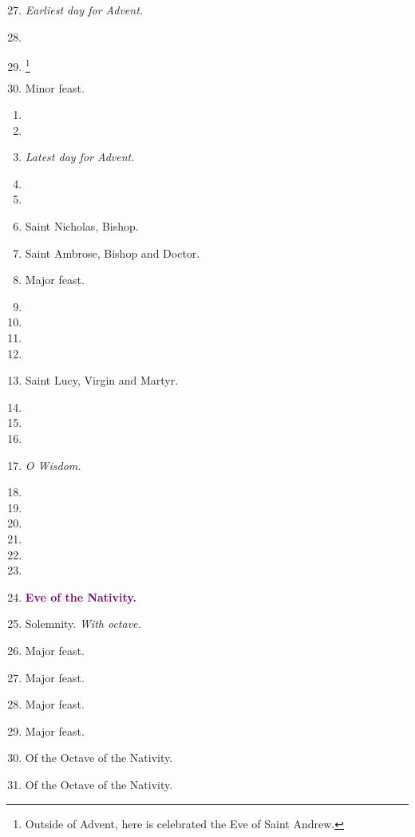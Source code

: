 		\begin{enumerate}
			\setcounter{enumi}{26}
			\item {\textit{\small Earliest day for Advent.}}
			\item %
			\item \footnote{Outside of Advent, here is celebrated the Eve of Saint Andrew.}
			\item {} Minor feast.
		\end{enumerate}
		\begin{enumerate}
			\item %
			\item %
			\item \textit{\small Latest day for Advent.} %
			\item  %
			\item %
			\item Saint Nicholas, Bishop. 
			\item Saint Ambrose, Bishop and Doctor. 
			\item {} Major feast.
			\item %
			\item %
			\item %
			\item  %
			\item Saint Lucy, Virgin and Martyr. 
			\item  %
			\item %
			\item %
			\item {\textit{\small O Wisdom.}} %
			\item  %
			\item  %
			\item  %
			\item %
			\item  %
			\item  %
			\item \textcolor{purple}{\textbf{Eve of the Nativity.}}
			\item \textbf{} Solemnity. \textit{With octave.}
			\item {} Major feast.
			\item {} Major feast.
			\item {} Major feast.
			\item {} Major feast.
			\item Of the Octave of the Nativity. %
			\item Of the Octave of the Nativity.
		\end{enumerate}
